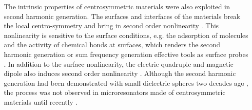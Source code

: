 The intrinsic properties of centrosymmetric materials were also exploited in second harmonic generation. The surfaces and interfaces of the materials break the local centro-symmetry and bring in second order nonlinearity \cite{heinz1991second}. This nonlinearity is sensitive to the surface conditions, e.g. the adsorption of molecules and the activity of chemical bonds at surfaces, which renders the second harmonic generation or sum frequency generation effective tools as surface probes \cite{shen1989surface, shank1983femtosecond, heinz1985study, tom1986investigation}. In addition to the surface nonlinearity, the electric quadruple and magnetic dipole also induces second order nonlinearity \cite{heinz1991second}. Although the second harmonic generation had been demonstrated with small dielectric spheres two decades ago \cite{martorell1997scattering, maymo2006visible, shan2006experimental}, the process was not observed in microresonators made of centrosymmetric materials until recently \cite{asano2016visible}.

